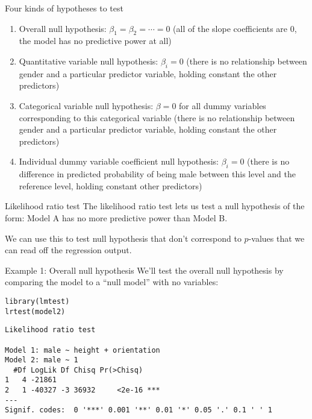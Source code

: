 \documentclass{beamer}\usepackage[]{graphicx}\usepackage[]{color}
\makeatletter
\newcommand{\hlstd}[1]{\textcolor[rgb]{1,0.894,0.769}{#1}}%
\newcommand{\hlkwd}[1]{\textcolor[rgb]{1,0.78,0.769}{#1}}%
\newenvironment{kframe}{%
 \def\at@end@of@kframe{}%
 \ifinner\ifhmode%
  \def\at@end@of@kframe{\end{minipage}}%
  \begin{minipage}{\columnwidth}%
 \fi\fi%
 \def\FrameCommand##1{\hskip\@totalleftmargin \hskip-\fboxsep
 \colorbox{shadecolor}{##1}\hskip-\fboxsep
     \hskip-\linewidth \hskip-\@totalleftmargin \hskip\columnwidth}%
 \MakeFramed {\advance\hsize-\width
   \@totalleftmargin\z@ \linewidth\hsize
   \@setminipage}}%
 {\par\unskip\endMakeFramed%
 \at@end@of@kframe}
\newenvironment{knitrout}{}{} %
\makeatother
\begin{document}
\begin{darkframes}
    \begin{frame}{Four kinds of hypotheses to test}
      \begin{enumerate}[<+->]
        \item \alert{Overall} null hypothesis: $\beta_1=\beta_2=\cdots=0$ (all of the slope coefficients are 0, the model has no predictive power at all)
        \item \alert{Quantitative variable} null hypothesis: $\beta_i=0$ (there is no relationship between gender and a particular predictor variable, holding constant the other predictors)
        \item \alert{Categorical variable} null hypothesis: $\beta=0$ for all dummy variables corresponding to this categorical variable (there is no relationship between gender and a particular predictor variable, holding constant the other predictors)
        \item \alert{Individual dummy variable coefficient} null hypothesis: $\beta_i=0$ (there is no difference in predicted probability of being male between this level and the reference level, holding constant other predictors)
      \end{enumerate}
    \end{frame}

    \begin{frame}{Likelihood ratio test}
      The \alert{likelihood ratio test} lets us test a null hypothesis of the form: Model A has no more predictive power than Model B.

      \bigskip

      We can use this to test null hypothesis that don't correspond to $p$-values that we can read off the regression output.
    \end{frame}

    \begin{frame}[fragile]{Example 1: Overall null hypothesis}
      We'll test the overall null hypothesis by comparing the model to a ``null model'' with no variables:
      \fontvsm
\begin{knitrout}
\begin{kframe}
\begin{alltt}
\hlkwd{library}\hlstd{(lmtest)}
\hlkwd{lrtest}\hlstd{(model2)}
\end{alltt}
\begin{verbatim}
Likelihood ratio test

Model 1: male ~ height + orientation
Model 2: male ~ 1
  #Df LogLik Df Chisq Pr(>Chisq)    
1   4 -21861                        
2   1 -40327 -3 36932     <2e-16 ***
---
Signif. codes:  0 '***' 0.001 '**' 0.01 '*' 0.05 '.' 0.1 ' ' 1
\end{verbatim}
\end{kframe}
\end{knitrout}
    \end{frame}


\end{darkframes}
\end{document}
